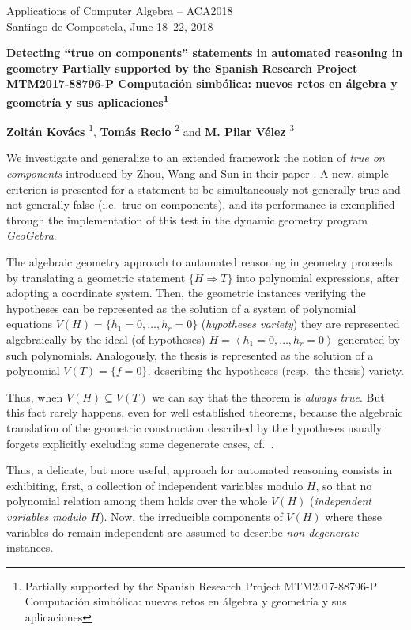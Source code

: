 \documentclass{article}
\makeatletter
\newcommand{\TITLE}[2][]{
  \begin{center} \Large \bfseries #2%
  \def\@temp{#1}\ifx\@temp\@empty\relax\else\footnote{#1}\fi\end{center}}
\newcommand{\AUTHOR}[2][]{\textbf{#2}%
  \def\@temp{#1}\ifx\@temp\@empty\relax\else\textsuperscript{#1}\fi}
\newcommand{\HEADING}{
{\noindent \small Applications of Computer Algebra -- ACA2018 \\
Santiago de Compostela, June 18--22, 2018} \vspace{10pt}}
\makeatother
\begin{document}
\HEADING


\TITLE[Partially supported by the Spanish Research Project MTM2017-88796-P
Computación simbólica: nuevos retos en álgebra y geometría y sus aplicaciones]{Detecting ``true on components'' statements in automated reasoning in geometry}

\begin{center}
 \AUTHOR[1]{Zoltán Kovács},
 \AUTHOR[2]{Tomás Recio} and
 \AUTHOR[3]{M. Pilar Vélez}
\end{center}



We investigate and generalize to an extended framework the notion of \emph{true on components} introduced by Zhou, Wang and Sun in their paper \cite{ZWS}.   A new, simple criterion is presented for a statement to be simultaneously not generally true and not generally false (i.e.~true on components),  and its performance is exemplified through the implementation of this test in the dynamic geometry program \textit{GeoGebra}.


The algebraic geometry approach to automated reasoning in geometry proceeds by translating a geometric statement $\{H\Rightarrow T\}$ into polynomial expressions, after adopting a coordinate system. Then, the geometric instances verifying the hypotheses  can be represented as the solution of a system of polynomial equations $V(H)=\{h_1=0,\dots,h_r=0\}$ (\emph{hypotheses variety}) they are represented algebraically by the ideal (of hypotheses) $H=\left<h_1=0,\dots,h_r=0\right>$ generated by such polynomials. Analogously, the thesis is represented as the solution of a polynomial
 $V(T)=\{f=0\}$,  describing the hypotheses (resp.~the thesis) variety. 

Thus, when $V(H) \subseteq V(T)$ we can say that the theorem is \emph{always true}. But this fact rarely happens, even for well established theorems, because the algebraic translation of the geometric construction described by the hypotheses usually forgets explicitly excluding some  degenerate cases, cf.~\cite{DR}.

Thus, a delicate, but more useful,  approach for automated reasoning consists in exhibiting, first, a collection of independent variables modulo $H$, so that no polynomial relation among them holds over the whole $V(H)$ (\emph{independent variables modulo $H$}).  Now, the irreducible components of $V(H)$ where these variables do  remain independent are assumed to describe \emph{non-degenerate} instances.
\end{document}
